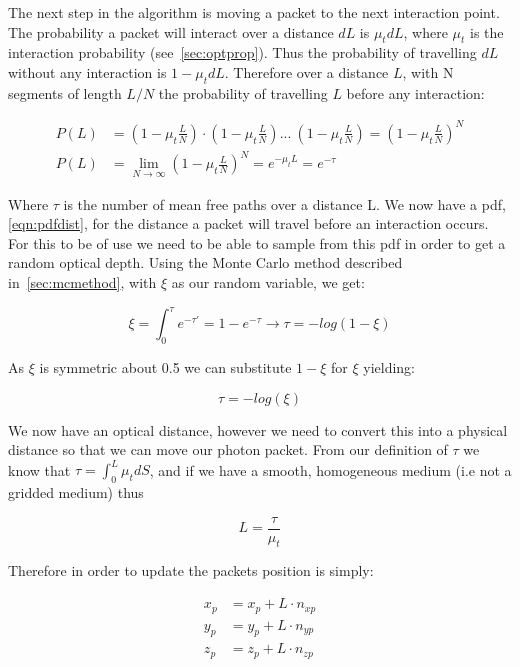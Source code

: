 The next step in the algorithm is moving a packet to the next interaction point. The probability a packet will interact over a distance $dL$ is $\mu_tdL$, where $\mu_t$ is the interaction probability (see~\cref{sec:optprop}). Thus the probability of travelling $dL$ without any interaction is $1-\mu_tdL$. Therefore over a distance $L$, with N segments of length $L/N$ the probability of travelling $L$ before any interaction:

\begin{align}
P(L) &= (1-\mu_t\frac{L}{N}) \cdot (1-\mu_t\frac{L}{N}) ...\ (1-\mu_t\frac{L}{N}) = (1-\mu_t\frac{L}{N})^N \\
P(L) &= \lim_{N \to \infty}(1-\mu_t\frac{L}{N})^N=e^{-\mu_tL}=e^{-\tau}\label{eqn:pdfdist}
\end{align}

Where $\tau$ is the number of mean free paths over a distance L. We now have a \gls{pdf}, \cref{eqn:pdfdist}, for the distance a packet will travel before an interaction occurs. For this to be of use we need to be able to sample from this \gls{pdf} in order to get a random optical depth. Using the Monte Carlo method described in~\cref{sec:mcmethod}, with $\xi$ as our random variable, we get:

\begin{equation}
\xi=\int_{0}^{\tau}e^{-\tau'}=1-e^{-\tau}\rightarrow \tau=-log(1-\xi)
\end{equation}

As $\xi$ is symmetric about 0.5 we can substitute $1-\xi$ for $\xi$ yielding:

\begin{equation}
\tau=-log(\xi)\label{eqn:taueqn}
\end{equation} 

We now have an optical distance, however we need to convert this into a physical distance so that we can move our photon packet. From our definition of $\tau$ we know that $\tau=\int_0^L\mu_tdS$, and if we have a smooth, homogeneous medium (i.e not a gridded medium) thus 

\begin{equation}
L=\frac{\tau}{\mu_t}\label{eqn:physicaldist}
\end{equation}

Therefore in order to update the packets position is simply:

\begin{align}
x_p &= x_p+L\cdot n_{xp}\label{eqn:update1}\\
y_p &= y_p+L\cdot n_{yp}\label{eqn:update2}\\
z_p &= z_p+L\cdot n_{zp}\label{eqn:update3}
\end{align}

